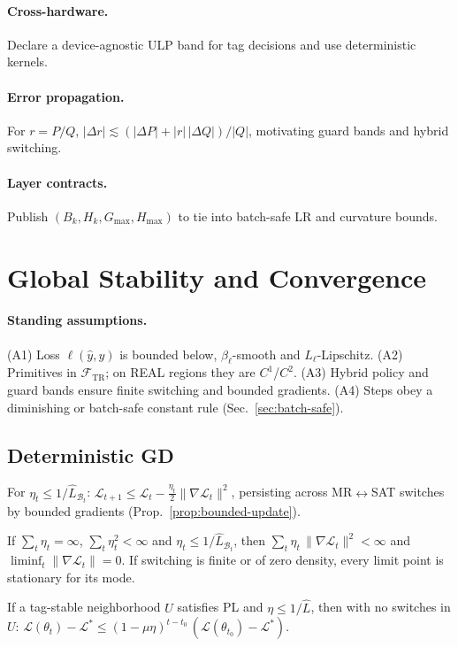 \documentclass[twoside,11pt]{article}
\begin{document}
\paragraph{Cross-hardware.} Declare a device-agnostic ULP band for tag decisions and use deterministic kernels.\par
\paragraph{Error propagation.} For $r=P/Q$, $|\Delta r|\lesssim (|\Delta P|+|r|\,|\Delta Q|)/|Q|$, motivating guard bands and hybrid switching.\par
\paragraph{Layer contracts.} Publish $(B_k,H_k,G_{\max},H_{\max})$ to tie into batch-safe LR and curvature bounds.

\section*{Global Stability and Convergence}
\label{sec:global-convergence}
\paragraph{Standing assumptions.} (A1) Loss $\ell(\hat y,y)$ is bounded below, $\beta_\ell$-smooth and $L_\ell$-Lipschitz. (A2) Primitives in $\mathcal{F}_{\!\mathrm{TR}}$; on REAL regions they are $C^1$/$C^2$. (A3) Hybrid policy and guard bands ensure finite switching and bounded gradients. (A4) Steps obey a diminishing or batch-safe constant rule (Sec.~\ref{sec:batch-safe}).\par
\subsection*{Deterministic GD} For $\eta_t\le 1/\widehat L_{\mathcal{B}_t}$: $\mathcal{L}_{t+1}\le \mathcal{L}_t-\tfrac{\eta_t}{2}\|\nabla\mathcal{L}_t\|^2$, persisting across MR$\leftrightarrow$SAT switches by bounded gradients (Prop.~\ref{prop:bounded-update}).\par
\begin{theorem}\label{thm:gd-diminishing}
If $\sum_t\eta_t=\infty$, $\sum_t\eta_t^2<\infty$ and $\eta_t\le 1/\widehat L_{\mathcal{B}_t}$, then $\sum_t\eta_t\,\|\nabla\mathcal{L}_t\|^2<\infty$ and $\liminf_t\|\nabla\mathcal{L}_t\|=0$. If switching is finite or of zero density, every limit point is stationary for its mode.
\end{theorem}
\begin{theorem}\label{thm:pl}
If a tag-stable neighborhood $U$ satisfies PL and $\eta\le 1/\widehat L$, then with no switches in $U$:
$\mathcal{L}(\theta_{t})-\mathcal{L}^*\le (1-\mu\eta)^{t-t_0}\,(\mathcal{L}(\theta_{t_0})-\mathcal{L}^*)$.
\end{theorem}
\end{document}

